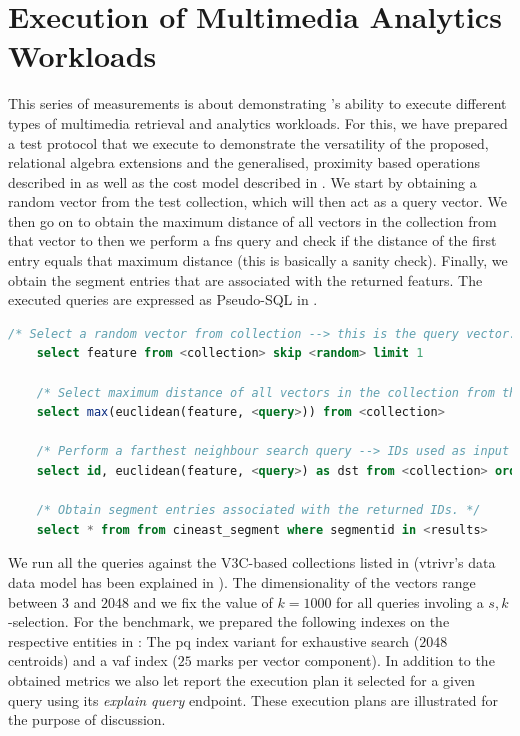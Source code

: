 \section{Execution of Multimedia Analytics Workloads}

This series of measurements is about demonstrating \cottontail{}'s ability to execute different types of multimedia retrieval and analytics workloads. For this, we have prepared a test protocol that we execute to demonstrate the versatility of the proposed, relational algebra extensions and the generalised, proximity based operations described in  as well as the cost model described in . We start by obtaining a random vector from the test collection, which will then act as a query vector. We then go on to obtain the maximum distance of all vectors in the collection from that vector to then we perform a \acrshort{fns} query and check if the distance of the first entry equals that maximum distance (this is basically a sanity check). Finally, we obtain the segment entries that are associated with the returned featurs. The executed queries are expressed as Pseudo-SQL in .

\begin{lstlisting}[language=SQL, caption={Pseudo-SQL of the queries executed for the analytics workload evaluation.}, label=listing:analytics_queries, numbers=none]
    /* Select a random vector from collection --> this is the query vector. */
    select feature from <collection> skip <random> limit 1
    
    /* Select maximum distance of all vectors in the collection from the query vector. */
    select max(euclidean(feature, <query>)) from <collection> 

    /* Perform a farthest neighbour search query --> IDs used as input for next query. */
    select id, euclidean(feature, <query>) as dst from <collection> order by dst asc limit 1000

    /* Obtain segment entries associated with the returned IDs. */
    select * from from cineast_segment where segmentid in <results>
\end{lstlisting}

We run all the queries against the V3C-based collections listed in  (vtrivr's \cite{Rossetto:2016Vitrivr,Gasser:2019Multimodal} data data model has been explained in ). The dimensionality of the vectors range between $3$ and $2048$ and we fix the value of $k = 1000$ for all queries involing a $s,k$-selection. For the benchmark, we prepared the following indexes on the respective entities in \cottontail{}: The \acrshort{pq} index variant for exhaustive search ($2048$ centroids) and a \acrshort{vaf} index ($25$ marks per vector component). In addition to the obtained metrics we also let \cottontail{} report the execution plan it selected for a given query using its \emph{explain query} endpoint. These execution plans are illustrated for the purpose of discussion.

